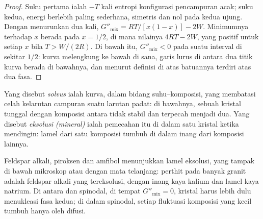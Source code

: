 \begin{proof}
Suku pertama ialah $-T$ kali entropi konfigurasi pencampuran acak;
suku kedua, energi berlebih paling sederhana, simetris dan nol pada kedua ujung.
Dengan menurunkan dua kali, $G''_{\text{mix}} = RT/[x(1 - x)] - 2W$. Minimumnya
terhadap $x$ berada pada $x = 1/2$, di mana nilainya $4RT - 2W$, yang positif untuk
setiap $x$ bila $T > W/(2R)$. Di bawah itu, $G''_{\text{mix}} < 0$ pada suatu interval
di sekitar $1/2$: kurva melengkung ke bawah di sana, garis lurus di antara dua titik
kurva berada di bawahnya, dan menurut definisi di atas batuannya terdiri atas
dua fasa.
\end{proof}

\begin{definition}\label{def:b3:petrological-thermodynamics:solvus}
Yang disebut \emph{solvus} ialah kurva, dalam bidang suhu--komposisi,
yang membatasi celah kelarutan campuran suatu larutan padat: di bawahnya, sebuah
kristal tunggal dengan komposisi antara tidak stabil dan terpecah menjadi dua.
Yang disebut \emph{eksolusi (mineral)} ialah pemecahan itu
di dalam satu kristal ketika mendingin: lamel dari satu komposisi tumbuh di dalam inang dari
komposisi lainnya.
\end{definition}

Feldspar alkali, piroksen dan amfibol menunjukkan lamel eksolusi,
yang tampak di bawah mikroskop atau dengan mata telanjang: perthit pada banyak granit
adalah feldspar alkali yang tereksolusi, dengan inang kaya kalium dan
lamel kaya natrium. Di antara  dan spinodal, di tempat $G''_{\text{mix}} = 0$,
kristal harus lebih dulu menukleasi fasa kedua; di dalam spinodal, setiap
fluktuasi komposisi yang kecil tumbuh hanya oleh difusi.

